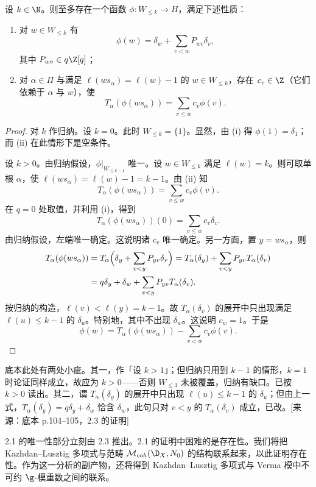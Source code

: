 \begin{lemma}\label{lem:05.2.3}
设 $k\in\N$。则至多存在一个函数 $\phi:W_{\leq k}\to H$，满足下述性质：
\begin{enumerate}[label=(\roman*)]
\item 对 $w\in W_{\leq k}$ 有
$$\phi(w)=\delta_w+\sum_{v<w}P_{wv}\delta_v,$$
其中 $P_{wv}\in q\Z[q]$；
\item 对 $\alpha\in\Pi$ 与满足 $\ell(ws_\alpha)=\ell(w)-1$ 的 $w\in W_{\leq k}$，存在 $c_v\in\Z$（它们依赖于 $\alpha$ 与 $w$），使
$$T_\alpha(\phi(ws_\alpha))=\sum_{v\leq w}c_v\phi(v).$$
\end{enumerate}
\end{lemma}

\begin{proof}
对 $k$ 作归纳。设 $k=0$。此时 $W_{\leq k}=\{1\}$。显然，由 (i) 得 $\phi(1)=\delta_1$；而 (ii) 在此情形下是空条件。

设 $k>0$。由归纳假设，$\phi|_{W_{\leq k-1}}$ 唯一。设 $w\in W_{\leq k}$ 满足 $\ell(w)=k$。则可取单根 $\alpha$，使 $\ell(ws_\alpha)=\ell(w)-1=k-1$。由 (ii) 知
$$T_\alpha(\phi(ws_\alpha))=\sum_{v\leq w}c_v\phi(v).$$
在 $q=0$ 处取值，并利用 (i)，得到
$$T_\alpha(\phi(ws_\alpha))(0)=\sum_{v\leq w}c_v\delta_v.$$
由归纳假设，左端唯一确定。这说明诸 $c_v$ 唯一确定。另一方面，置 $y=ws_\alpha$，则
\begin{align*}
T_\alpha(\phi(ws_\alpha))
&=T_\alpha\Bigl(\delta_y+\sum_{v<y}P_{yv}\delta_v\Bigr)
=T_\alpha(\delta_y)+\sum_{v<y}P_{yv}T_\alpha(\delta_v)\\
&=q\delta_y+\delta_w+\sum_{v<y}P_{yv}T_\alpha(\delta_v).
\end{align*}
按归纳的构造，$\ell(v)<\ell(y)=k-1$。故 $T_\alpha(\delta_v)$ 的展开中只出现满足 $\ell(u)\leq k-1$ 的 $\delta_u$。特别地，其中不出现 $\delta_w$。这说明 $c_w=1$。于是
$$\phi(w)=T_\alpha(\phi(ws_\alpha))-\sum_{v<w}c_v\phi(v).$$
\end{proof}

\begin{annote}
底本此处有两处小疵。其一，作「设 $k>1$」；但归纳只用到 $k-1$ 的情形，$k=1$ 时论证同样成立，故应为 $k>0$——否则 $W_{\leq 1}$ 未被覆盖，归纳有缺口。已按 $k>0$ 读出。其二，谓 $T_\alpha(\delta_y)$ 的展开中只出现 $\ell(u)\leq k-1$ 的 $\delta_u$；但由上一式，$T_\alpha(\delta_y)=q\delta_y+\delta_w$ 恰含 $\delta_w$，此句只对 $v<y$ 的 $T_\alpha(\delta_v)$ 成立，已改。[来源：底本 p.104--105，2.3 的证明]
\end{annote}

2.1 的唯一性部分立刻由 2.3 推出。2.1 的证明中困难的是存在性。我们将把 Kazhdan--Lusztig 多项式与范畴 $\mathcal{M}_{coh}(\D_X,N_0)$ 的结构联系起来，以此证明存在性。作为这一分析的副产物，还将得到 Kazhdan--Lusztig 多项式与 Verma 模中不可约 $\g$-模重数之间的联系。


